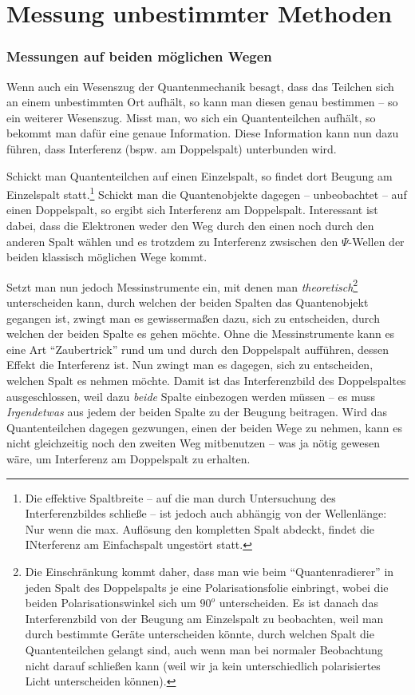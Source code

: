 	\section{Messung unbestimmter Methoden}


\subsubsection{Messungen auf beiden möglichen Wegen}
Wenn auch ein Wesenszug der Quantenmechanik besagt, dass das Teilchen sich an einem unbestimmten Ort aufhält, so kann man diesen genau bestimmen -- so ein weiterer Wesenszug. Misst man, wo sich ein Quantenteilchen aufhält, so bekommt man dafür eine genaue Information. Diese Information kann nun dazu führen, dass Interferenz (bspw. am Doppelspalt) unterbunden wird.

Schickt man Quantenteilchen auf einen Einzelspalt, so findet dort Beugung am Einzelspalt statt.\footnote{Die effektive Spaltbreite -- auf die man durch Untersuchung des Interferenzbildes schließe -- ist jedoch auch abhängig von der Wellenlänge: Nur wenn die max. Auflösung den kompletten Spalt abdeckt, findet die INterferenz am Einfachspalt ungestört statt.} Schickt man die Quantenobjekte dagegen -- unbeobachtet -- auf einen Doppelspalt, so ergibt sich Interferenz am Doppelspalt. Interessant ist dabei, dass die Elektronen weder den Weg durch den einen noch durch den anderen Spalt wählen und es trotzdem zu Interferenz zwsischen den $\Psi$-Wellen der beiden klassisch möglichen Wege kommt.

Setzt man nun jedoch Messinstrumente ein, mit denen man \emph{theoretisch}\footnote{Die Einschränkung kommt daher, dass man wie beim "`Quantenradierer"' in jeden Spalt des Doppelspalts je eine Polarisationsfolie einbringt, wobei die beiden Polarisationswinkel sich um $90^o$ unterscheiden. Es ist danach das Interferenzbild von der Beugung am Einzelspalt zu beobachten, weil man durch bestimmte Geräte unterscheiden könnte, durch welchen Spalt die Quantenteilchen gelangt sind, auch wenn man bei normaler Beobachtung nicht darauf schließen kann (weil wir ja kein unterschiedlich polarisiertes Licht unterscheiden können).} unterscheiden kann, durch welchen der beiden Spalten das Quantenobjekt gegangen ist, zwingt man es gewissermaßen dazu, sich zu entscheiden, durch welchen der beiden Spalte es gehen möchte. Ohne die Messinstrumente kann es eine Art "`Zaubertrick"' rund um und durch den Doppelspalt aufführen, dessen Effekt die Interferenz ist. Nun zwingt man es dagegen, sich zu entscheiden, welchen Spalt es nehmen möchte. Damit ist das Interferenzbild des Doppelspaltes ausgeschlossen, weil dazu \emph{beide} Spalte einbezogen werden müssen -- es muss \emph{Irgendetwas} aus jedem der beiden Spalte zu der Beugung beitragen. Wird das Quantenteilchen dagegen gezwungen, einen der beiden Wege zu nehmen, kann es nicht gleichzeitig noch den zweiten Weg mitbenutzen -- was ja nötig gewesen wäre, um Interferenz am Doppelspalt zu erhalten.




